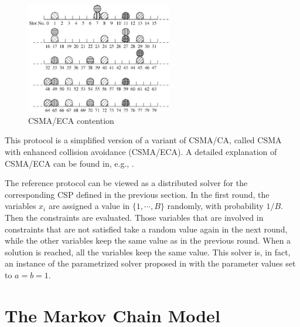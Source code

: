 \documentclass[journal]{IEEEtran}
\newcommand{\Az}[1]{{\color{blue}{#1}}}
\newcommand{\AzDel}[1]{{\color{red}{\{REMOVE: #1\}}}}
\begin{document}
\begin{figure}
  \centering
  \includegraphics[width=2.5in]{figures/csma_eca_compact}
  \caption{CSMA/ECA contention}
  \label{fig:csma_eca_compact}
\end{figure}

This protocol is a simplified version of a variant of CSMA/CA, called CSMA with enhanced collision avoidance (CSMA/ECA). A detailed explanation of CSMA/ECA can be found in, e.g., \cite{barcelo2008lba,barcelo2009tpc,he2009srb,fang2011dlm}.

The reference protocol can be viewed as a distributed solver for the corresponding CSP defined in the previous section. In the first round, the variables $x_i$ are assigned a value in $\{1,\cdots, B \}$ randomly, with probability $1/B$. Then the constraints are evaluated.
Those variables that are involved in constraints that are not satisfied take a random value again in the next round, while the other variables keep the same value as in the previous round.
When a solution is reached, all the variables keep the same value. This solver is, in fact, an instance of the parametrized solver proposed in \cite{duffy2011dcs} with the parameter values set to $a=b=1$.


\section{The Markov Chain Model}
\label{sec:markov_chain}

\end{document}
